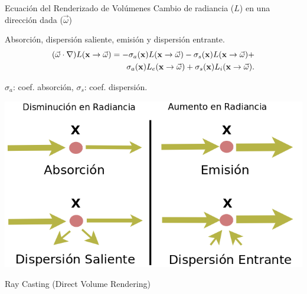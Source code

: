 \documentclass[spanish,unknownkeysallowed,10pt]{beamer}
\begin{document}
\begin{frame}{Ecuación del Renderizado de Volúmenes}
Cambio de radiancia ($L$) en una dirección dada ($\vec{\omega}$) 

Absorción, dispersión saliente, emisión y dispersión entrante.
\begin{equation*}
\begin{aligned}
(\vec{\omega} \cdot \nabla) L(\bold{x} \rightarrow \vec{\omega}) = - \sigma_{a}(\bold{x}) L(\bold{x} \rightarrow \vec{\omega}) - \sigma_{s}(\bold{x}) L(\bold{x} \rightarrow \vec{\omega}) + \\
\sigma_{a}(\bold{x}) L_{e}(\bold{x} \rightarrow \vec{\omega}) + \sigma_{s}(\bold{x}) L_{i}(\bold{x} \rightarrow \vec{\omega}).
\end{aligned}
\end{equation*}

$\sigma_{a}$: coef. absorción, $\sigma_{s}$: coef. dispersión.

\centering
\includegraphics[scale = 0.3]{../figures/fenomenosrte}

Ray Casting (Direct Volume Rendering)
\end{frame}
\end{document}
